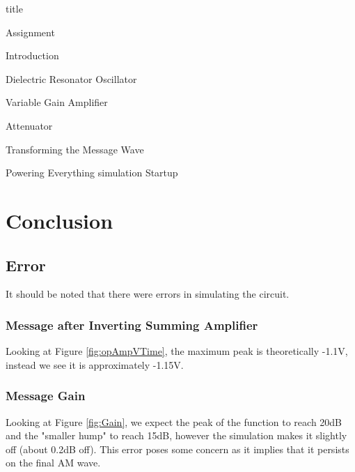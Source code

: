 \documentclass{article}
\begin{document}
{title}

\frontmatter

\tableofcontents

\listoffigures

\mainmatter

{Assignment}

{Introduction}


{Dielectric Resonator Oscillator}

{Variable Gain Amplifier}

{Attenuator}

{Transforming the Message Wave}

{Powering Everything}
{simulation}
{Startup}
\section{Conclusion}

\subsection{Error}
It should be noted that there were errors in simulating the circuit.
    \subsubsection{Message after Inverting Summing Amplifier}
    Looking at Figure \ref{fig:opAmpVTime}, the maximum peak is theoretically -1.1V, instead we see it is approximately -1.15V. 

    \subsubsection{Message Gain}
    Looking at Figure \ref{fig:Gain}, we expect the peak of the function to reach 20dB and the "smaller hump" to reach 15dB, however the simulation makes it slightly off (about 0.2dB off). This error poses some concern as it implies that it persists on the final AM wave.
\end{document}

